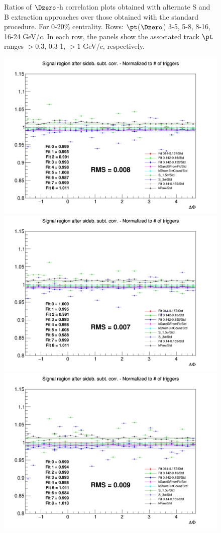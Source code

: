 \begin{figure}
 \caption{Ratios of $\Dzero$-h correlation plots obtained with alternate S and B extraction approaches over those obtained with the standard procedure. For 0-20\% centrality. Rows: $\pt$($\Dzero$) 3-5, 5-8, 8-16, 16-24 GeV/$c$. In each row, the panels show the associated track
$\pt$ ranges $> 0.3$, 0.3-1, $> 1$ GeV/$c$, respectively.}
\label{fig:SysSandB020}
\end{figure}

\begin{figure}
\centering
{\includegraphics[width=0.31\linewidth]{figuresVsCent/Dstar/SystSandB/020_SandB_Syst/Ratio_AzimCorrDistr_Dstar_Canvas_PtIntBins2to3_PoolInt_thr03to99_YIELD_020.png}}
{\includegraphics[width=0.31\linewidth]{figuresVsCent/Dstar/SystSandB/020_SandB_Syst/Ratio_AzimCorrDistr_Dstar_Canvas_PtIntBins2to3_PoolInt_thr03to1_YIELD_020.png}}
{\includegraphics[width=0.31\linewidth]{figuresVsCent/Dstar/SystSandB/020_SandB_Syst/Ratio_AzimCorrDistr_Dstar_Canvas_PtIntBins2to3_PoolInt_thr1to99_YIELD_020.png}} \\


\end{figure}
